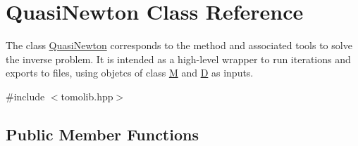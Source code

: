 \hypertarget{class_quasi_newton}{}\section{Quasi\+Newton Class Reference}
\label{class_quasi_newton}


The class \hyperlink{class_quasi_newton}{Quasi\+Newton} corresponds to the method and associated tools to solve the inverse problem. It is intended as a high-\/level wrapper to run iterations and exports to files, using objetcs of class \hyperlink{class_m}{M} and \hyperlink{class_d}{D} as inputs.  




{\ttfamily \#include $<$tomolib.\+hpp$>$}

\subsection*{Public Member Functions}
